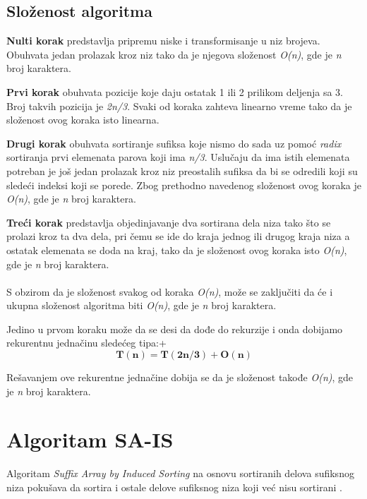\documentclass[serbian]{article}
\begin{document}
\subsection{Složenost algoritma}

\textbf{Nulti korak} predstavlja pripremu niske i transformisanje u niz brojeva. Obuhvata jedan prolazak kroz niz tako da je njegova složenost \textit{O(n)}, gde je \textit{n} broj karaktera.

\textbf{Prvi korak} obuhvata pozicije koje daju ostatak 1 ili 2 prilikom deljenja sa 3. Broj takvih pozicija je \textit{2n/3}. Svaki od koraka zahteva linearno vreme tako da je složenost ovog koraka isto linearna.

\textbf{Drugi korak} obuhvata sortiranje sufiksa koje nismo do sada uz pomoć \textit{radix} sortiranja prvi elemenata parova koji ima \textit{n/3}. Uslučaju da ima istih elemenata potreban je još jedan prolazak kroz niz preostalih sufiksa da bi se odredili koji su sledeći indeksi koji se porede. Zbog prethodno navedenog složenost ovog koraka je \textit{O(n)}, gde je \textit{n} broj karaktera.

\textbf{Treći korak} predstavlja objedinjavanje dva sortirana dela niza tako što se prolazi kroz ta dva dela, pri čemu se ide do kraja jednog ili drugog kraja niza a ostatak elemenata se doda na kraj, tako da je složenost ovog koraka isto \textit{O(n)}, gde je \textit{n} broj karaktera.
\\\\
S obzirom da je složenost svakog od koraka \textit{O(n)}, može se zaključiti da će i ukupna složenost algoritma biti \textit{O(n)}, gde je \textit{n} broj karaktera.

Jedino u prvom koraku može da se desi da dođe do rekurzije i onda dobijamo rekurentnu jednačinu sledećeg tipa:+
\begin{equation}
\mathbf{T(n) = T(2n/3) + O(n)}
\end{equation}

Rešavanjem ove rekurentne jednačine dobija se da je složenost takođe \textit{O(n)}, gde je \textit{n} broj karaktera.

\section{Algoritam SA-IS}
Algoritam \textit{Suffix Array by Induced Sorting} na osnovu sortiranih delova sufiksnog niza pokušava da sortira i ostale delove sufiksnog niza koji već nisu sortirani \cite{sais, presentation_sais, master_sais}.
\end{document}
